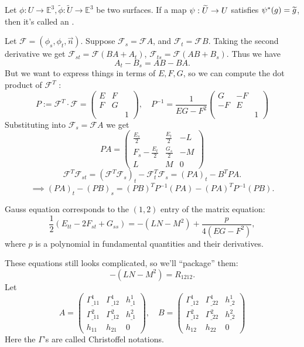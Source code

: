 \begin{definition}[Isometries]
	Let $\phi: U\to \mathbb{E}^{3}, \widetilde{\phi}: \widetilde{U}\to \mathbb{E}^{3}$
	be two surfaces. If a map $\psi: \widetilde{U}\to U$ satisfies
	$\psi^*(g) = \widetilde{g}$, then it's called an .
\end{definition}

Let $\mathcal{F} = (\phi_s, \phi_t, \vec{n})$.
Suppose $\mathcal{F}_s = \mathcal{F} A$, and $\mathcal{F}_t = \mathcal{F}B$.
Taking the second derivative we get $\mathcal{F}_{st} = \mathcal{F} (BA + A_t)$,
$\mathcal{F}_{ts} = \mathcal{F} (AB + B_s)$.
Thus we have
\[
A_t - B_s = AB - BA.
\]
But we want to express things in terms of $E,F,G$, so
we can compute the dot product of $\mathcal{F}^T$ :
\[
P := \mathcal{F}^T \cdot \mathcal{F} = \begin{pmatrix}
	E &F\\ F& G\\ &&1
\end{pmatrix}
,\quad
P^{-1} = \frac{1}{EG - F^2}
\begin{pmatrix}
	G &-F \\ -F &E \\ &&1
\end{pmatrix}
\]
Substituting into $\mathcal{F}_s = \mathcal{F}A$ we get
\[
PA = \begin{pmatrix}
	\frac{E_s}{2} & \frac{E_t}{2} &-L\\
	F_s - \frac{E_t}{2} & \frac{G_s}{2} &-M\\
	L &M &0
\end{pmatrix}
\]
\[
\mathcal{F}^T \mathcal{F}_{st} = (\mathcal{F}^T \mathcal{F}_s)_t - \mathcal{F}^T_t
\mathcal{F}_s = (PA)_t - B^TPA.
\]
\[
\implies (PA)_t - (PB)_s = (PB)^TP^{-1}(PA) - (PA)^TP^{-1}(PB).
\]

Gauss equation corresponds to the $(1,2)$ entry of the matrix equation:
\[
\frac{1}{2}(E_{tt} - 2F_{st} + G_{ss}) = -(LN-M^2) + \frac{p}{4(EG-F^2)},
\]
where $p$ is a polynomial in fundamental quantities and their derivatives.

These equations still looks complicated, so we'll ``package'' them:
\[
-(LN - M^2) = R_{1212}.
\]
Let
\[
A = \begin{pmatrix}
	\Gamma_{\_11}^1 &\Gamma_{\_12}^1 &h_{\_1}^1\\
	\Gamma_{\_11}^2 &\Gamma_{\_12}^2 &h_{\_1}^2\\
	h_{11} &h_{21} &0
\end{pmatrix}, \quad
B = \begin{pmatrix}
	\Gamma_{\_12}^1 &\Gamma_{\_22}^1 &h_{\_2}^1\\
	\Gamma_{\_12}^2 &\Gamma_{\_22}^2 &h_{\_2}^2\\
	h_{12} &h_{22} &0
\end{pmatrix}
\]
Here the $\Gamma$'s are called Christoffel notations.

